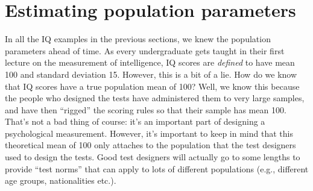 \documentclass[
  11pt,
  a4paper,
  twoside,symmetric,openright]{book}
\theoremstyle{break}
\theoremstyle{break}
\begin{document}
\section{Estimating population parameters}\label{pointestimates}

In all the IQ examples in the previous sections, we knew the population parameters ahead of time. As every undergraduate gets taught in their first lecture on the measurement of intelligence, IQ scores are \emph{defined} to have mean 100 and standard deviation 15. However, this is a bit of a lie. How do we know that IQ scores have a true population mean of 100? Well, we know this because the people who designed the tests have administered them to very large samples, and have then ``rigged'' the scoring rules so that their sample has mean 100. That's not a bad thing of course: it's an important part of designing a psychological measurement. However, it's important to keep in mind that this theoretical mean of 100 only attaches to the population that the test designers used to design the tests. Good test designers will actually go to some lengths to provide ``test norms'' that can apply to lots of different populations (e.g., different age groups, nationalities etc.).
\end{document}
